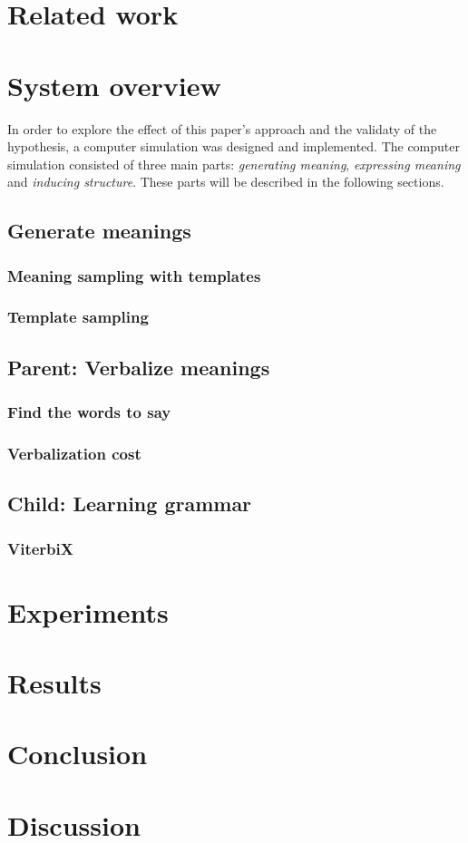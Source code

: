 \documentclass[a4paper]{article}
\begin{document}
\section{Related work}
\section{System overview}
\label{sec:system_overview}
In order to explore the effect of this paper's approach and the validaty of the hypothesis, a computer simulation was designed and implemented. The computer simulation consisted of three main parts: \emph{generating meaning}, \emph{expressing meaning} and \emph{inducing structure}. These parts will be described in the following sections.
\subsection{Generate meanings}
\subsubsection{Meaning sampling with templates}
\subsubsection{Template sampling}

\subsection{Parent: Verbalize meanings}
\subsubsection{Find the words to say}
\subsubsection{Verbalization cost}
\subsection{Child: Learning grammar} %
\subsubsection{ViterbiX} %
\section{Experiments}
\label{sec:experiments}
\section{Results}
\label{sec:results}
\section{Conclusion}
\label{sec:conclusion}
\section{Discussion}
\label{sec:discussion}



\end{document}
